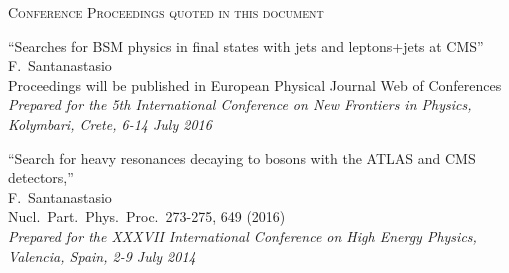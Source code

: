 \documentclass[10pt, a4paper]{article}
\begin{document}
\begin{thebibliography}{599}
\vspace{0.1cm} \begin{center} \textsc{Conference Proceedings quoted in
    this document} \end{center} \vspace{0.05cm}

  ``Searches for BSM physics in ﬁnal states with jets and leptons+jets at CMS''
  \\{}F.~Santanastasio
   \\{} Proceedings will be published in European Physical Journal Web of Conferences
  \\{}{\it Prepared for the 5th International Conference on New
    Frontiers in Physics, Kolymbari, Crete, 6-14 July 2016} 

``Search for heavy resonances decaying to bosons with the ATLAS and CMS detectors,'' 
 \\{}F.~Santanastasio 
 \\ Nucl.\ Part.\ Phys.\ Proc.\  273-275, 649 (2016)
  \\{}{\it Prepared for the XXXVII International Conference on High Energy Physics, Valencia, Spain, 2-9 July 2014}





\end{thebibliography}
\end{document}
